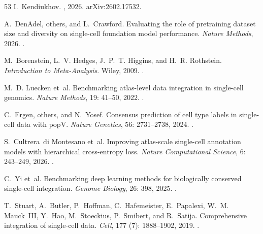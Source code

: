 \documentclass[fleqn,10pt,lineno]{wlpeerj}  %
\begin{document}
\begin{thebibliography}{53}
I.~Kendiukhov.
, 2026.
\newblock arXiv:2602.17532.

A.~DenAdel, others, and L.~Crawford.
\newblock Evaluating the role of pretraining dataset size and diversity on
  single-cell foundation model performance.
\newblock \emph{Nature Methods}, 2026.
\newblock {}.

M.~Borenstein, L.~V. Hedges, J.~P.~T. Higgins, and H.~R. Rothstein.
\newblock \emph{Introduction to {Meta-Analysis}}.
\newblock Wiley, 2009.
\newblock {}.

M.~D. Luecken et~al.
\newblock Benchmarking atlas-level data integration in single-cell genomics.
\newblock \emph{Nature Methods}, 19: 41--50, 2022.
\newblock {}.

C.~Ergen, others, and N.~Yosef.
\newblock Consensus prediction of cell type labels in single-cell data with
  {popV}.
\newblock \emph{Nature Genetics}, 56: 2731--2738, 2024.
\newblock {}.

S.~Cultrera~di Montesano et~al.
\newblock Improving atlas-scale single-cell annotation models with hierarchical
  cross-entropy loss.
\newblock \emph{Nature Computational Science}, 6: 243--249, 2026.
\newblock {}.

C.~Yi et~al.
\newblock Benchmarking deep learning methods for biologically conserved
  single-cell integration.
\newblock \emph{Genome Biology}, 26: 398, 2025.
\newblock {}.

T.~Stuart, A.~Butler, P.~Hoffman, C.~Hafemeister, E.~Papalexi, W.~M. Mauck~III,
  Y.~Hao, M.~Stoeckius, P.~Smibert, and R.~Satija.
\newblock Comprehensive integration of single-cell data.
\newblock \emph{Cell}, 177 (7): 1888--1902, 2019.
\newblock {}.


\end{thebibliography}
\end{document}
